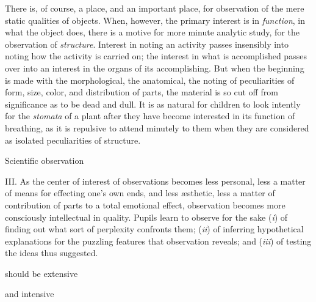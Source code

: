 \documentclass[letterpaper]{book}
\begin{document}
There is, of course, a place, and an important place, for observation of
the mere static qualities of objects. When, however, the primary
interest is in \emph{function}, in what the object does, there is a
motive for more minute analytic study, for the observation of
\emph{structure}. Interest in noting an activity passes insensibly into
noting how the activity is carried on; the interest in what is
accomplished passes over into an interest in the organs of its
accomplishing. But when the beginning is made with the morphological,
the anatomical, the noting of peculiarities of form, size, color, and
distribution of parts, the material is so cut off from significance as
to be dead and dull. It is as natural for children to look intently for
the \emph{stomata} of a plant after they have become interested in its
function of breathing, as it is repulsive to attend minutely to them
when they are considered as isolated peculiarities of
structure.

Scientific observation

III. As the center of interest of observations becomes less personal,
less a matter of means for effecting one's own ends, and less æsthetic,
less a matter of contribution of parts to a total emotional effect,
observation becomes more consciously intellectual in quality. Pupils
learn to observe for the sake (\emph{i}) of finding out what sort of
perplexity confronts them; (\emph{ii}) of inferring hypothetical
explanations for the puzzling features that observation reveals; and
(\emph{iii}) of testing the ideas thus suggested.

should be extensive

and intensive
\end{document}

